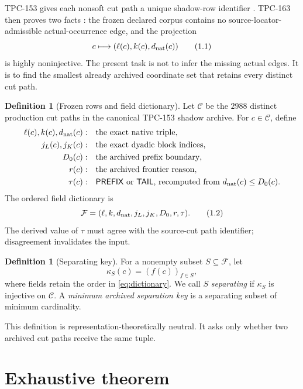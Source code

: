 \documentclass[11pt]{article}
\theoremstyle{definition}
\newtheorem{definition}[theorem]{Definition}
\theoremstyle{remark}
\newcommand{\Fdict}{\mathcal F}
\begin{document}
TPC-153 gives each nonsoft cut path a unique shadow-row identifier
\citep{WangTPC153}.  TPC-163 then proves two facts
\citep{WangTPC163}: the frozen declared corpus contains no
source-locator-admissible actual-occurrence edge, and the projection
\[
 c\longmapsto(\ell(c),k(c),d_{\rm nat}(c))
 \tag{1.1}\label{eq:native-projection}
\]
is highly noninjective.  The present task is not to infer the missing
actual edges.  It is to find the smallest already archived coordinate
set that retains every distinct cut path.

\begin{definition}[Frozen rows and field dictionary]\label{def:fields}
Let \(\mathcal C\) be the \(2988\) distinct production cut paths in
the canonical TPC-153 shadow archive.  For \(c\in\mathcal C\), define
\[
\begin{aligned}
\ell(c),k(c),d_{\rm nat}(c)&:
   &&\text{the exact native triple},\\
j_L(c),j_K(c)&:
   &&\text{the exact dyadic block indices},\\
D_0(c)&:
   &&\text{the archived prefix boundary},\\
r(c)&:
   &&\text{the archived frontier reason},\\
\tau(c)&:
   &&\text{\(\mathsf{PREFIX}\) or \(\mathsf{TAIL}\), recomputed from }
       d_{\rm nat}(c)\le D_0(c).
\end{aligned}
\]
The ordered field dictionary is
\[
 \Fdict=(\ell,k,d_{\rm nat},j_L,j_K,D_0,r,\tau).
 \tag{1.2}\label{eq:dictionary}
\]
The derived value of \(\tau\) must agree with the source-cut path
identifier; disagreement invalidates the input.
\end{definition}

\begin{definition}[Separating key]\label{def:key}
For a nonempty subset \(S\subseteq\Fdict\), let
\[
 \kappa_S(c)=(f(c))_{f\in S},
 \tag{1.3}\label{eq:projected-key}
\]
where fields retain the order in \eqref{eq:dictionary}.  We call \(S\)
\emph{separating} if \(\kappa_S\) is injective on \(\mathcal C\).  A
\emph{minimum archived separation key} is a separating subset of
minimum cardinality.
\end{definition}

This definition is representation-theoretically neutral.  It asks
only whether two archived cut paths receive the same tuple.

\section{Exhaustive theorem}
\end{document}
